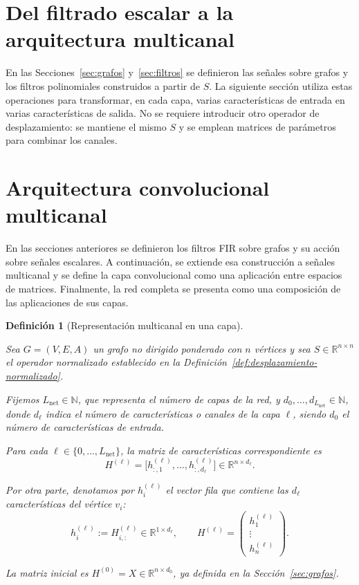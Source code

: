 \documentclass[a4paper,openany,oneside,10pt]{report}
\theoremstyle{pnlTeorema}
\theoremstyle{pnlDefinicion}
\newtheorem{definicion}{Definición}[section]
\theoremstyle{pnlObservacion}
\begin{document}
\section{Del filtrado escalar a la arquitectura multicanal}
\label{sec:transicion-multicanal}

En las Secciones~\ref{sec:grafos} y~\ref{sec:filtros} se definieron las señales sobre grafos y los filtros polinomiales construidos a partir de $S$. La siguiente sección utiliza estas operaciones para transformar, en cada capa, varias características de entrada en varias características de salida. No se requiere introducir otro operador de desplazamiento: se mantiene el mismo $S$ y se emplean matrices de parámetros para combinar los canales.

\section{Arquitectura convolucional multicanal}
\label{sec:arquitectura-multicanal}

En las secciones anteriores se definieron los filtros FIR sobre grafos y su acción sobre señales escalares. A continuación, se extiende esa construcción a señales multicanal y se define la capa convolucional como una aplicación entre espacios de matrices. Finalmente, la red completa se presenta como una composición de las aplicaciones de sus capas.


\begin{definicion}[Representación multicanal en una capa]
\label{def:gcnn-representacion}

Sea $G=(V,E,A)$ un grafo no dirigido ponderado con
$n$ vértices y sea $S\in\mathbb R^{n\times n}$ el
operador normalizado establecido en la
Definición~\ref{def:desplazamiento-normalizado}.

Fijemos $L_{\mathrm{net}}\in\mathbb N$, que representa
el número de capas de la red, y
$d_0,\ldots,d_{L_{\mathrm{net}}}\in\mathbb N$,
donde $d_\ell$ indica el número de características
o canales de la capa $\ell$, siendo $d_0$ el número
de características de entrada.

Para cada $\ell\in\{0,\ldots,L_{\mathrm{net}}\}$,
la matriz de características correspondiente es
\[
H^{(\ell)}=
\bigl[h_{:,1}^{(\ell)},\ldots,
h_{:,d_\ell}^{(\ell)}\bigr]
\in\mathbb R^{n\times d_\ell}.
\]

Por otra parte, denotamos por $h_i^{(\ell)}$
el vector fila que contiene las $d_\ell$
características del vértice $v_i$:
\[
h_i^{(\ell)}:=H_{i,:}^{(\ell)}
\in\mathbb R^{1\times d_\ell},
\qquad
H^{(\ell)}=
\begin{pmatrix}
h_1^{(\ell)}\\
\vdots\\
h_n^{(\ell)}
\end{pmatrix}.
\]

La matriz inicial es
$H^{(0)}=X\in\mathbb R^{n\times d_0}$,
ya definida en la Sección~\ref{sec:grafos}.

\end{definicion}
\end{document}
